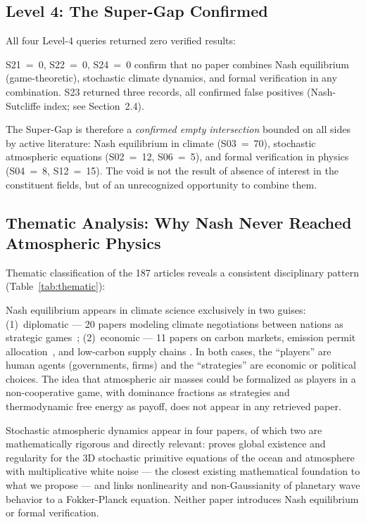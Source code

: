 \documentclass[gmd, manuscript]{copernicus}
\begin{document}
\subsection{Level 4: The Super-Gap Confirmed}

All four Level-4 queries returned zero verified results:

S21~=~0, S22~=~0, S24~=~0 confirm that no paper combines Nash
equilibrium (game-theoretic), stochastic climate dynamics, and formal
verification in any combination. S23 returned three records, all
confirmed false positives (Nash-Sutcliffe index; see Section~2.4).

The Super-Gap is therefore a \textit{confirmed empty intersection}
bounded on all sides by active literature: Nash equilibrium in climate
(S03~=~70), stochastic atmospheric equations (S02~=~12, S06~=~5),
and formal verification in physics (S04~=~8, S12~=~15). The void is
not the result of absence of interest in the constituent fields, but of
an unrecognized opportunity to combine them.

\subsection{Thematic Analysis: Why Nash Never Reached Atmospheric Physics}

Thematic classification of the 187 articles reveals a consistent
disciplinary pattern (Table~\ref{tab:thematic}):

Nash equilibrium appears in climate science exclusively in two guises:
(1)~diplomatic — 20 papers modeling climate negotiations between nations
as strategic games~\citep{DeCanio2013, Forgo2005, Breton2003, Long2018}; (2)~economic — 11
papers on carbon markets, emission permit allocation~\citep{Haurie2004}, and low-carbon
supply chains \citep{Hamidoglu2024}. In both cases, the ``players'' are
human agents (governments, firms) and the ``strategies'' are economic or
political choices. The idea that atmospheric air masses could be
formalized as players in a non-cooperative game, with dominance
fractions as strategies and thermodynamic free energy as payoff, does
not appear in any retrieved paper.

Stochastic atmospheric dynamics appear in four papers, of which two are
mathematically rigorous and directly relevant: \citet{Debussche2012}
proves global existence and regularity for the 3D stochastic primitive
equations of the ocean and atmosphere with multiplicative white noise —
the closest existing mathematical foundation to what we propose — and
\citet{Majda2006} links nonlinearity and non-Gaussianity of planetary
wave behavior to a Fokker-Planck equation. Neither paper introduces Nash
equilibrium or formal verification.
\end{document}
